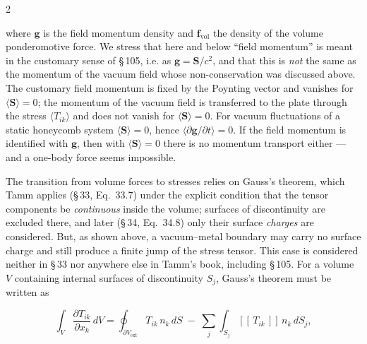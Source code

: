 \documentclass[twoside, 10pt]{article}
\begin{document}
\begin{multicols}{2}

where \(\mathbf{g}\) is the field momentum density and \(\mathbf{f}_{\mathrm{vol}}\) the density of the volume ponderomotive force. We stress that here and below ``field momentum'' is meant in the customary sense of \S\,105, i.e. as \(\mathbf g=\mathbf S/c^2\), and that this is \emph{not} the same as the momentum of the vacuum field whose non-conservation was discussed above. The customary field momentum is fixed by the Poynting vector and vanishes for \(\langle\mathbf S\rangle=0\); the momentum of the vacuum field is transferred to the plate through the stress \(\langle T_{ik}\rangle\) and does not vanish for \(\langle\mathbf S\rangle=0\). For vacuum fluctuations of a static honeycomb system
\(\langle\mathbf{S}\rangle=0\), hence \(\langle\partial\mathbf{g}/\partial t\rangle=0\). If the field
momentum is identified with \(\mathbf g\), then with \(\langle\mathbf S\rangle=0\) there is no
momentum transport either --- and a one-body force seems impossible.

The transition from volume forces to stresses relies on Gauss's theorem, which Tamm applies
(\S\,33, Eq.~33.7) under the explicit condition that the tensor components be \emph{continuous}
inside the volume; surfaces of discontinuity are excluded there, and later (\S\,34, Eq.~34.8) only
their surface \emph{charges} are considered. But, as shown above, a vacuum--metal boundary may carry
no surface charge and still produce a finite jump of the stress tensor. This case is considered
neither in \S\,33 nor anywhere else in Tamm's book, including \S\,105. For a volume \(V\) containing
internal surfaces of discontinuity \(S_j\), Gauss's theorem must be written as

\end{multicols}
\[
\int_V \frac{\partial T_{ik}}{\partial x_k}\,dV
= \oint_{\partial V_{\mathrm{ext}}} T_{ik}\,n_k\,dS
\;-\; \sum_j \int_{S_j} [\![\,T_{ik}\,]\!]\,n_k\,dS_j ,
\]
\end{document}
